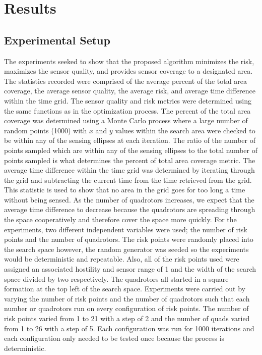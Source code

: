 \documentclass[12pt]{article}
\begin{document}
\section{Results}

\subsection{Experimental Setup}

The experiments seeked to show that the proposed algorithm minimizes the risk,
maximizes the sensor quality, and provides sensor coverage to a designated
area. The statistics recorded were comprised of the average percent of the
total area coverage, the average sensor quality, the average risk, and average
time difference within the time grid. The sensor quality and risk metrics were
determined using the same functions as in the optimization process. The percent
of the total area coverage was determined using a Monte Carlo process where a
large number of random points (1000) with $x$ and $y$ values within the search
area were checked to be within any of the sensing ellipses at each iteration.
The ratio of the number of points sampled which are within any of the sensing
ellipses to the total number of points sampled is what determines the percent
of total area coverage metric. The average time difference within the time grid
was determined by iterating through the grid and subtracting the current time
from the time retrieved from the grid. This statistic is used to show that no
area in the grid goes for too long a time without being sensed. As the number
of quadrotors increases, we expect that the average time difference to decrease
because the quadrotors are spreading through the space cooperatively and
therefore cover the space more quickly. For the experiments, two different
independent variables were used; the number of risk points and the number of
quadrotors.  The risk points were randomly placed into the search space
however, the random generator was seeded so the experiments would be
deterministic and repeatable.  Also, all of the risk points used were assigned
an associated hostility and sensor range of 1 and the width of the search space
divided by two respectively. The quadrotors all started in a square formation
at the top left of the search space.  Experiments were carried out by varying
the number of risk points and the number of quadrotors such that each number or
quadrotors run on every configuration of risk points.  The number of risk
points varied from 1 to 21 with a step of 2 and the number of quads varied from
1 to 26 with a step of 5.  Each configuration was run for 1000 iterations and
each configuration only needed to be tested once because the process is
deterministic. 
\end{document}
